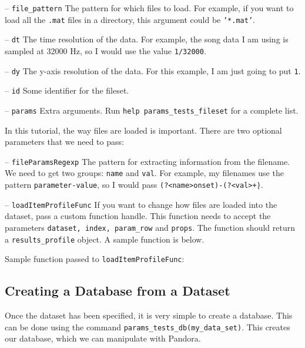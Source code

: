 \documentclass{article}
\let\oldmarginpar\marginpar
\renewcommand\marginpar[1]{\-\oldmarginpar[\raggedleft #1]%
{\raggedright #1}}
\newenvironment{checklist}{%
  \begin{list}{}{}%
  \let\olditem\item
  \renewcommand\item{\olditem -- \marginpar{$\Box$} }
  \newcommand\checkeditem{\olditem -- \marginpar{$\CheckedBox$} }
}{%
  \end{list}
}
\begin{document}
\begin{checklist}
	\item		\texttt{file\_pattern} The pattern for which files to load. For example, if you want to load all the \texttt{.mat} files in a directory, this argument could be \texttt{'*.mat'}.
	\item		\texttt{dt} The time resolution of the data. For example, the song data I am using is sampled at 32000 Hz, so I would use the value \texttt{1/32000}.
	\item		\texttt{dy} The y-axis resolution of the data. For this example, I am just going to put \texttt{1}.
	\item		\texttt{id} Some identifier for the fileset.
	\item		\texttt{params} Extra arguments. Run \texttt{help params\_tests\_fileset} for a complete list.
\end{checklist}

In this tutorial, the way files are loaded is important. There are two optional parameters that we need to pass:

\begin{checklist}
	\item		\texttt{fileParamsRegexp} The pattern for extracting information from the filename. We need to get two groups: \texttt{name} and \texttt{val}. For example, my filenames use the pattern \texttt{parameter-value}, so I would pass \texttt{(?<name>onset)-(?<val>\d+)}.
	\item		\texttt{loadItemProfileFunc} If you want to change how files are loaded into the dataset, pass a custom function handle. This function needs to accept the parameters \texttt{dataset, index, param\_row} and \texttt{props}. The function should return a \texttt{results\_profile} object. A sample function is below.
\end{checklist}

Sample function passed to \texttt{loadItemProfileFunc}:



\subsection{Creating a Database from a Dataset}

Once the dataset has been specified, it is very simple to create a database. This can be done using the command \texttt{params\_tests\_db(my\_data\_set)}. This creates our database, which we can manipulate with Pandora.\\
\end{document}
